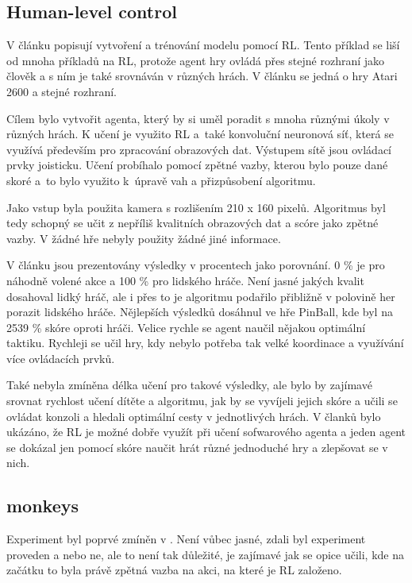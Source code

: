 \documentclass{article}
\begin{document}
\subsection{Human-level control}
V článku \cite{mnih2015human} popisují vytvoření a trénování modelu pomocí RL. Tento příklad se liší od mnoha příkladů na RL, protože agent hry ovládá přes stejné rozhraní jako člověk a s ním je také srovnáván v různých hrách. V článku se jedná o hry Atari 2600 a stejné rozhraní.

Cílem bylo vytvořit agenta, který by si uměl poradit s mnoha různými úkoly v různých hrách. K učení je využito RL a~také konvoluční neuronová síť, která se využívá především pro zpracování obrazových dat. Výstupem sítě jsou ovládací prvky joisticku. Učení probíhalo pomocí zpětné vazby, kterou bylo pouze dané skoré a~to bylo využito k~úpravě vah a přizpůsobení algoritmu. 

Jako vstup byla použita kamera s rozlišením 210 x 160 pixelů. Algoritmus byl tedy schopný se učit z nepříliš kvalitních obrazových dat a scóre jako zpětné vazby. V žádné hře nebyly použity žádné jiné informace. 

V článku jsou prezentovány výsledky v procentech jako porovnání. 0 \% je pro náhodně volené akce a 100 \% pro lidského hráče. Není jasné jakých kvalit dosahoval lidký hráč, ale i přes to je algoritmu podařilo přibližně v polovině her porazit lidského hráče. Nějlepších výsledků dosáhnul ve hře PinBall, kde byl na 2539 \% skóre oproti hráči. Velice rychle se agent naučil nějakou optimální taktiku. Rychleji se učil hry, kdy nebylo potřeba tak velké koordinace a využívání více ovládacích prvků. 

Také nebyla zmíněna délka učení pro takové výsledky, ale bylo by zajímavé srovnat rychlost učení dítěte a algoritmu, jak by se vyvíjeli jejich skóre a učili se ovládat konzoli a hledali optimální cesty v jednotlivých hrách. V članků bylo ukázáno, že RL je možné dobře využít při učení sofwarového agenta a jeden agent se dokázal jen pomocí skóre naučit hrát různé jednoduché hry a zlepšovat se v nich. 

\subsection{monkeys}
\label{monkey}
Experiment byl poprvé zmíněn v \cite{hamel1996competing}. Není vůbec jasné, zdali byl experiment proveden a nebo ne, ale to není tak důležité, je zajímavé jak se opice učili, kde na začátku to byla právě zpětná vazba na akci, na které je RL založeno.
\end{document}
